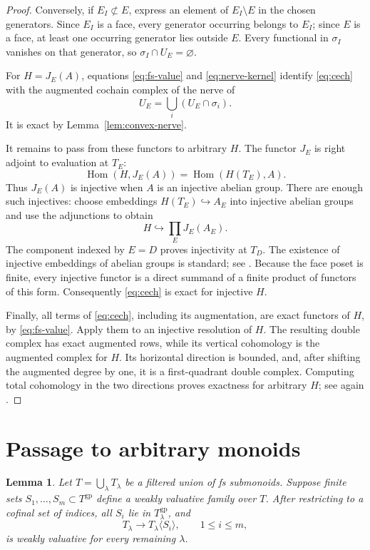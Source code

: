\documentclass[11pt]{article}
\newtheorem{lemma}[theorem]{Lemma}
\theoremstyle{definition}
\theoremstyle{remark}
\DeclareMathOperator{\Hom}{Hom}
\newcommand{\gp}{\mathrm{gp}}
\begin{document}
\begin{proof}
Conversely, if \(E_I\not\subset E\), express an element of
\(E_I\setminus E\) in the chosen generators. Since \(E_I\) is a
face, every generator occurring belongs to \(E_I\); since \(E\)
is a face, at least one occurring generator lies outside \(E\).
Every functional in \(\sigma_I\) vanishes on that generator, so
\(\sigma_I\cap U_E=\varnothing\).

For \(H=J_E(A)\), equations \eqref{eq:fs-value} and
\eqref{eq:nerve-kernel} identify \eqref{eq:cech} with the augmented
cochain complex of the nerve of
\[
U_E=\bigcup_i(U_E\cap\sigma_i).
\]
It is exact by Lemma~\ref{lem:convex-nerve}.

It remains to pass from these functors to arbitrary \(H\).
The functor \(J_E\) is right adjoint to evaluation at \(T_E\):
\[
\Hom(H,J_E(A))=\Hom(H(T_E),A).
\]
Thus \(J_E(A)\) is injective when \(A\) is an injective abelian
group. There are enough such injectives: choose embeddings
\(H(T_E)\hookrightarrow A_E\) into injective abelian groups and
use the adjunctions to obtain
\[
H\hookrightarrow\prod_E J_E(A_E).
\]
The component indexed by \(E=D\) proves injectivity at \(T_D\).
The existence of injective embeddings of abelian groups is
standard; see \cite[Tag~01D6]{Stacks}.
Because the face poset is finite, every injective functor is a
direct summand of a finite product of functors of this form.
Consequently \eqref{eq:cech} is exact for injective \(H\).

Finally, all terms of \eqref{eq:cech}, including its augmentation,
are exact functors of \(H\), by \eqref{eq:fs-value}. Apply them to
an injective resolution of \(H\). The resulting double complex
has exact augmented rows, while its vertical cohomology is the
augmented complex for \(H\). Its horizontal direction is bounded,
and, after shifting the augmented degree by one, it is a
first-quadrant double complex. Computing total cohomology in the
two directions proves exactness for arbitrary \(H\); see again
\cite[Tag~012X]{Stacks}.
\end{proof}

\section{Passage to arbitrary monoids}

\begin{lemma}\label{lem:weak-descent}
Let \(T=\bigcup_\lambda T_\lambda\) be a filtered union of fs
submonoids. Suppose finite sets \(S_1,\ldots,S_m\subset T^{\gp}\)
define a weakly valuative family over \(T\). After restricting to
a cofinal set of indices, all \(S_i\) lie in \(T_\lambda^{\gp}\),
and
\[
T_\lambda\longrightarrow T_\lambda\langle S_i\rangle,
\qquad 1\le i\le m,
\]
is weakly valuative for every remaining \(\lambda\).
\end{lemma}
\end{document}
